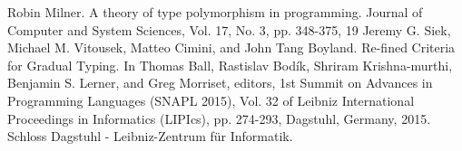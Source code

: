 \documentclass[11pt,twocolumn]{classes/yokou}
\begin{document}
\begin{thebibliography}{9}
	\bibitem{} Robin Milner. A theory of type polymorphism in programming. Journal of Computer and System Sciences, Vol. 17, No. 3, pp. 348-375, 19
	\bibitem{} Jeremy G. Siek, Michael M. Vitousek, Matteo Cimini, and John Tang Boyland. Re-fined Criteria for Gradual Typing. In Thomas Ball, Rastislav Bodík, Shriram Krishna-murthi, Benjamin S. Lerner, and Greg Morriset, editors, 1st Summit on Advances in Programming Languages (SNAPL 2015), Vol. 32 of Leibniz International Proceedings in Informatics (LIPIcs), pp. 274-293, Dagstuhl, Germany, 2015. Schloss Dagstuhl - Leibniz-Zentrum für Informatik.
\end{thebibliography}
\end{document}
